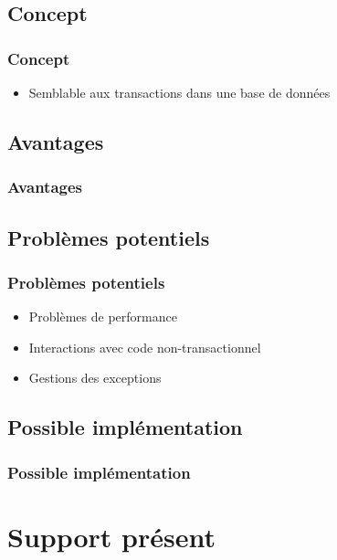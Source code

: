 \documentclass{beamer}
\begin{document}
\subsection{Concept}
\begin{frame}
\frametitle{Concept}
\begin{itemize}
\item Semblable aux transactions dans une base de données
\end{itemize}
\end{frame}

\subsection{Avantages}
\begin{frame}
\frametitle{Avantages}

\end{frame}

\subsection{Problèmes potentiels}
\begin{frame}
\frametitle{Problèmes potentiels}
\begin{itemize}
\item Problèmes de performance
\item<2-> Interactions avec code non-transactionnel
\item<3-> Gestions des exceptions
\end{itemize}
\end{frame}

\subsection{Possible implémentation}
\begin{frame}
\frametitle{Possible implémentation}

\end{frame}

\section{Support présent}
\end{document}
